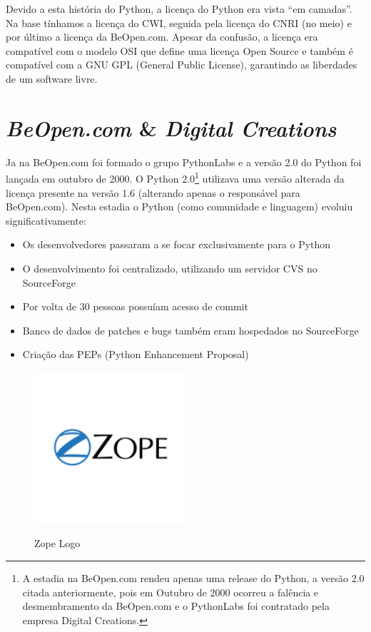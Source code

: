 Devido a esta história do Python, a licença do Python era vista “em camadas”.
Na base tínhamos a licença do CWI, seguida pela licença do CNRI (no meio) e por último a licença da BeOpen.com.
Apesar da confusão, a licença era compatível com o modelo OSI que define uma licença Open Source e também é compatível com a GNU GPL (General Public License), garantindo as liberdades de um software livre.

\section{\textit{BeOpen.com} \& \textit{Digital Creations}}
Ja na BeOpen.com foi formado o grupo PythonLabs e a versão 2.0 do Python foi lançada em outubro de 2000.
O Python 2.0\footnote{
    A estadia na BeOpen.com rendeu apenas uma release do Python, a versão 2.0 citada anteriormente, pois em Outubro de 2000 ocorreu a falência e desmembramento da BeOpen.com e o PythonLabs foi contratado pela empresa Digital Creations.
} utilizava uma versão alterada da licença presente na versão 1.6 (alterando apenas o responsável para BeOpen.com).
Nesta estadia o Python (como comunidade e linguagem) evoluiu significativamente:
\begin{itemize}
    \item Os desenvolvedores passaram a se focar exclusivamente para o Python
    \item O desenvolvimento foi centralizado, utilizando um servidor CVS no SourceForge
    \item Por volta de 30 pessoas possuíam acesso de commit
    \item Banco de dados de patches e bugs também eram hospedados no SourceForge
    \item Criação das PEPs (Python Enhancement Proposal)
\end{itemize}

\begin{figure}[!htb]
    \centering
    \caption{Zope Logo}
    \includegraphics[width=0.5\textwidth]{./dados/figuras/zope.png}
    \label{fig:figura-zope}
\end{figure}

